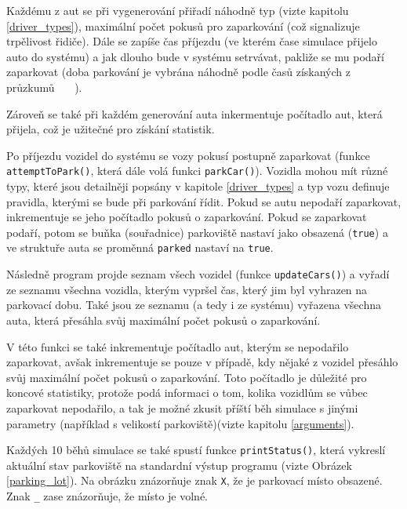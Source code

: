 \documentclass[11pt, a4paper]{article}
\begin{document}
Každému z aut se při vygenerování přiřadí náhodně typ (vizte kapitolu \ref{driver_types}), maximální počet pokusů pro zaparkování (což signalizuje trpělivost řidiče). Dále se zapíše čas příjezdu (ve kterém čase simulace přijelo auto do systému) a jak dlouho bude v systému setrvávat, pakliže se mu podaří zaparkovat (doba parkování je vybrána náhodně podle časů získaných z průzkumů ~\cite{Arndt_Gronmo_1977}~\cite{Bawa_Sinha_Kant_2019}~\cite{Rodgers_2023}).

Zároveň se také při každém generování auta inkermentuje počítadlo aut, která přijela, což je užitečné pro získání statistik.

\bigskip

\noindent Po příjezdu vozidel do systému se vozy pokusí postupně zaparkovat (funkce \texttt{attemptToPark()}, která dále volá funkci \texttt{parkCar()}). Vozidla mohou mít různé typy, které jsou detailněji popsány v kapitole \ref{driver_types} a typ vozu definuje pravidla, kterými se bude při parkování řídit. Pokud se autu nepodaří zaparkovat, inkrementuje se jeho počítadlo pokusů o zaparkování. Pokud se zaparkovat podaří, potom se buňka (souřadnice) parkoviště nastaví jako obsazená (\texttt{true}) a ve struktuře auta se proměnná \texttt{parked} nastaví na \texttt{true}.

\bigskip

\noindent Následně program projde seznam všech vozidel (funkce \texttt{updateCars()}) a vyřadí ze seznamu všechna vozidla, kterým vypršel čas, který jim byl vyhrazen na parkovací dobu. Také jsou ze seznamu (a tedy i ze systému) vyřazena všechna auta, která přesáhla svůj maximální počet pokusů o zaparkování.

V této funkci se také inkrementuje počítadlo aut, kterým se nepodařilo zaparkovat, avšak inkrementuje se pouze v případě, kdy nějaké z vozidel přesáhlo svůj maximální počet pokusů o zaparkování. Toto počítadlo je důležité pro koncové statistiky, protože podá informaci o tom, kolika vozidlům se vůbec zaparkovat nepodařilo, a tak je možné zkusit příští běh simulace s jinými parametry (například s velikostí parkoviště)(vizte kapitolu \ref{arguments}).

\bigskip

\noindent Každých 10 běhů simulace se také spustí funkce \texttt{printStatus()}, která vykreslí aktuální stav parkoviště na standardní výstup programu (vizte Obrázek \ref{parking_lot}). Na obrázku znázorňuje znak \texttt{X}, že je parkovací místo obsazené. Znak \texttt{\_} zase znázorňuje, že místo je volné.
\end{document}
